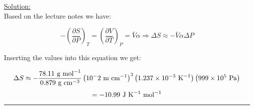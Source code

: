 \noindent
\underline{Solution:}\\

Based on the lecture notes we have:

$$-\left(\frac{\partial S}{\partial P}\right)_T = \left(\frac{\partial V}{\partial T}\right)_P = \bar{V}\alpha \Rightarrow \Delta S \approx -\bar{V}\alpha\Delta P$$

Inserting the values into this equation we get:

$$\Delta S\approx -\frac{78.11\textnormal{ g mol}^{-1}}{0.879\textnormal{ g cm}^{-3}}\left(10^-2\textnormal{ m cm}^{-1}\right)^3\left(1.237\times 10^{-3}\textnormal{ K}^{-1}\right)\left(999\times 10^5\textnormal{ Pa}\right)$$
$$ = -10.99\textnormal{ J K}^{-1}\textnormal{ mol}^{-1}$$

\hrule\vspace{0.5cm}
